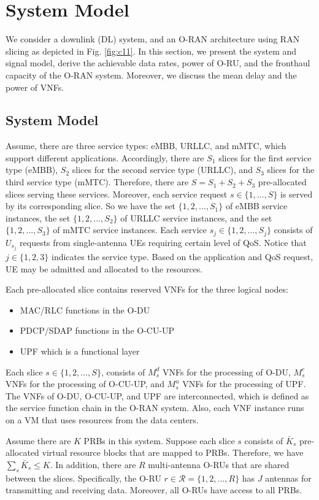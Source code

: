 \documentclass[lettersize,journal]{IEEEtran}
\begin{document}
\section{System Model}\label{systemmodel}
We consider a downlink (DL) system, and an O-RAN architecture using RAN slicing as depicted in Fig. \ref{fig:c11}.
In this section, we present the system and signal model, derive the achievable data rates, power of O-RU, and the fronthaul capacity  of the O-RAN system. Moreover, we discuss the mean delay and the power of VNFs.
\subsection{System Model}
Assume, there are three service types: eMBB, URLLC, and mMTC, which support different applications. Accordingly, there are $S_1$ slices for the first service type (eMBB), $S_2$ slices for the second service type (URLLC), and $S_3$ slices for the third service type (mMTC).
Therefore, there are $S = S_1 + S_2 + S_3$ pre-allocated slices serving these services.
Moreover, each service request $s\in \{1,\ldots,S\}$ is served by its corresponding slice. So we have the set
$\{1,2,...,S_1\}$ of eMBB service instances, the set $\{1,2,...,S_2\}$ of URLLC service instances, and the set
$\{1,2,...,S_3\}$ of mMTC service instances.
Each service $s_j\in \{1,2,...,S_j\} $ consists of $U_{s_j}$ requests from  single-antenna UEs requiring certain level of QoS. Notice that $j \in \{1,2,3\}$ indicates the service type.
Based on the application and QoS request, UE may be admitted and allocated to the resources.

Each pre-allocated slice contains reserved VNFs for the three logical nodes:
\begin{itemize}
\item MAC/RLC functions in the O-DU 
\item PDCP/SDAP functions in the O-CU-UP
\item UPF which is a functional layer
\end{itemize}
Each slice $s \in \{1,2,...,S \}$, consists of  $M_s^{d}$ VNFs for the processing of O-DU, $M_s^{c}$ VNFs for the processing of O-CU-UP, and $M_s^{u}$ VNFs for the processing of UPF.
The VNFs of O-DU, O-CU-UP, and UPF are interconnected, which is defined as the service function chain in the O-RAN system. Also, each VNF instance runs on a VM that uses resources from the data centers.


Assume there are $K$ PRBs in this system. Suppose each slice $s$ consists of $\bar{K}_s$ pre-allocated virtual resource blocks that are mapped to PRBs. Therefore, we have $\sum_s \bar{K}_s \leq K$.
In addition, there are $R$ multi-antenna O-RUs that are shared between the slices. Specifically, the O-RU $r \in \mathcal{R}=\{1,2,...,R \}$ has $J$ antennas for transmitting and receiving data. Moreover, all O-RUs have access to all PRBs.
\end{document}
